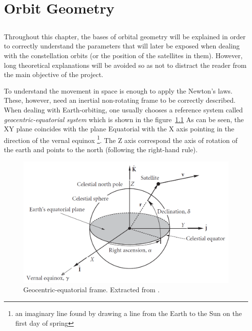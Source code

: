 \chapter{Orbit Geometry}


\section*{}
\paragraph{}
Throughout this chapter, the bases of orbital geometry will be explained in order to correctly understand the parameters that will later be exposed when dealing with the constellation orbits (or the position of the satellites in them). However, long theoretical explanations will be avoided so as not to distract the reader from the main objective of the project.

To understand the movement in space is enough to apply the Newton's laws. These, however, need an inertial non-rotating frame to be correctly described. When dealing with Earth-orbiting, one usually chooses a reference system called \textit{geocentric-equatorial system} which is shown in the figure~\ref{fig:eqframe} As can be seen, the XY plane coincides with the plane Equatorial with the X axis pointing in the direction of the vernal equinox \footnote{an imaginary line found by drawing a line from the Earth to the Sun on the first day of spring}. The Z axis correspond the axis of rotation of the earth and points to the north (following the right-hand rule).

\begin{figure}[H]
\centering
\includegraphics[scale=.55]{./Geometry/fig-Ch1-Geometry/eqframe.png}
\caption{Geocentric-equatorial frame. Extracted from \cite{Howard}.}
\label{fig:eqframe}
\end{figure}

